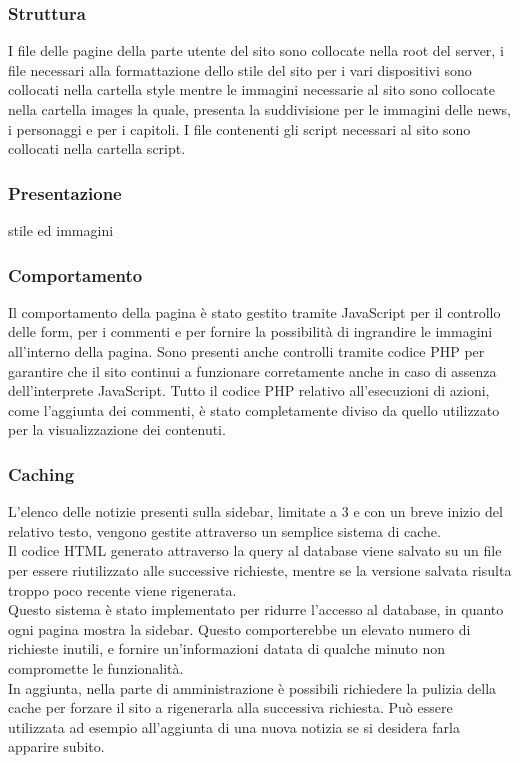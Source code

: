 \documentclass[openany, a4paper, 12pt]{report}
\begin{document}
			\subsubsection{Struttura}
			I file delle pagine della parte utente del sito sono collocate nella root del server, i file necessari alla formattazione dello stile del sito per i vari dispositivi sono collocati nella cartella style mentre le immagini necessarie al sito sono collocate nella cartella images la quale, presenta la suddivisione per le immagini delle news, i personaggi e per i capitoli. I file contenenti gli script necessari al sito sono collocati nella cartella script. 
			\subsubsection{Presentazione}
			stile ed immagini
			\subsubsection{Comportamento}
			Il comportamento della pagina è stato gestito tramite JavaScript per il controllo delle form, per i commenti e per fornire la possibilità di ingrandire le immagini all'interno della pagina. Sono presenti anche controlli tramite codice PHP per garantire che il sito continui a funzionare corretamente anche in caso di assenza dell'interprete JavaScript.
			Tutto il codice PHP relativo all'esecuzioni di azioni, come l'aggiunta dei commenti, è stato completamente diviso da quello utilizzato per la visualizzazione dei contenuti.\\
			\subsubsection{Caching}
			L'elenco delle notizie presenti sulla sidebar, limitate a 3 e con un breve inizio del relativo testo, vengono gestite attraverso un semplice sistema di cache.\\
			Il codice HTML generato attraverso la query al database viene salvato su un file per essere riutilizzato alle successive richieste, mentre se la versione salvata risulta troppo poco recente viene rigenerata.\\
			Questo sistema è stato implementato per ridurre l'accesso al database, in quanto ogni pagina mostra la sidebar. Questo comporterebbe un elevato numero di richieste inutili, e fornire un'informazioni datata di qualche minuto non compromette le funzionalità.\\
			In aggiunta, nella parte di amministrazione è possibili richiedere la pulizia della cache per forzare il sito a rigenerarla alla successiva richiesta.  Può essere utilizzata ad esempio all'aggiunta di una nuova notizia se si desidera farla apparire subito.
\end{document}
